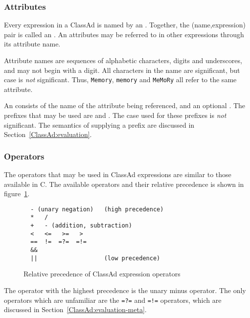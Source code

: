 \subsubsection{Attributes}
Every expression in a ClassAd is named by an .  Together,
the (name,expression) pair is called an .  An attributes may be
referred to in other expressions through its attribute name.

Attribute names are sequences of alphabetic characters, digits and underscores,
and may not begin with a digit.  All characters in the name are significant,
but case is \emph{not} significant.  Thus, \verb+Memory+, \verb+memory+ and 
\verb+MeMoRy+ all refer to the same attribute.

An  consists of the name of the attribute being 
referenced, and an optional .  The 
prefixes that may be used are  and .
The case used for these prefixes is \emph{not} significant.
The semantics of supplying a prefix are discussed in 
Section~\ref{ClassAd:evaluation}.

\subsubsection{Operators}
The operators that may be used in ClassAd expressions are similar to those
available in C.  The available operators and their relative precedence is shown 
in figure~\ref{ClassAd:operator-fig}.
\begin{figure}[h]
\begin{verbatim}
  - (unary negation)   (high precedence)
  *   / 
  +   - (addition, subtraction)
  <   <=   >=   >
  ==  !=  =?=  =!=
  &&
  ||                   (low precedence) 
\end{verbatim}
\caption{\label{ClassAd:operator-fig}Relative precedence of ClassAd expression
operators}
\end{figure}
The operator with the highest precedence is the unary minus operator.  The
only operators which are unfamiliar are the \verb+=?=+ and \verb+=!=+
operators, which are discussed in Section~\ref{ClassAd:evaluation-meta}.


